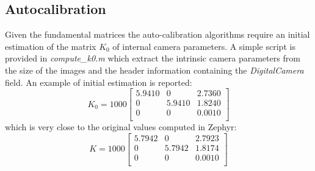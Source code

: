 \documentclass[11pt]{article}
\begin{document}
\subsection{Autocalibration}
Given the fundamental matrices the auto-calibration algorithms require an initial estimation of the matrix $K_0$ of internal camera parameters. A simple script is provided in \textit{compute\_k0.m} which extract the intrinsic camera parameters from the size of the images and the header information containing the \textit{DigitalCamera} field. An example of initial estimation is reported:
\begin{equation*}
K_0 = 1000 \begin{bmatrix}
    5.9410   &      0   & 2.7360\\
         0   & 5.9410    &1.8240\\
         0    &     0    &0.0010\\
    
        \end{bmatrix}
\end{equation*}
which is very close to the original values computed in Zephyr:
\begin{equation*}
    K = 1000 \begin{bmatrix}
     5.7942 &        0 &   2.7923\\
          0  &  5.7942  &  1.8174\\
          0  &       0  &  0.0010\\
        \end{bmatrix}
    \end{equation*}
\end{document}
